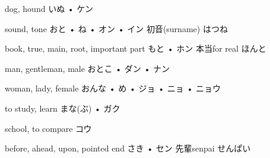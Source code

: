 



\setcounter{cardnum}{41}

		{dog, hound}
		{いぬ • ケン}
		{}{}
		{}{}
		{}{}
		{}{}
		{}{}

		{sound, tone}
		{おと • ね • オン • イン}
		{初音}{(surname) はつね}
		{}{}
		{}{}
		{}{}
		{}{}

		{book, true, main, root, important part}
		{もと • ホン}
		{本当}{for real ほんと}
		{}{}
		{}{}
		{}{}
		{}{}

		{man, gentleman, male}
		{おとこ • ダン • ナン}
		{}{}
		{}{}
		{}{}
		{}{}
		{}{}

		{woman, lady, female}
		{おんな • め • ジョ • ニョ • ニョウ}
		{}{}
		{}{}
		{}{}
		{}{}
		{}{}

		{to study, learn}
		{まな(ぶ) • ガク}
		{}{}
		{}{}
		{}{}
		{}{}
		{}{}

		{school, to compare}
		{コウ}
		{}{}
		{}{}
		{}{}
		{}{}
		{}{}

		{before, ahead, upon, pointed end}
		{さき • セン}
		{先輩}{senpai せんぱい}
		{}{}
		{}{}
		{}{}
		{}{}

